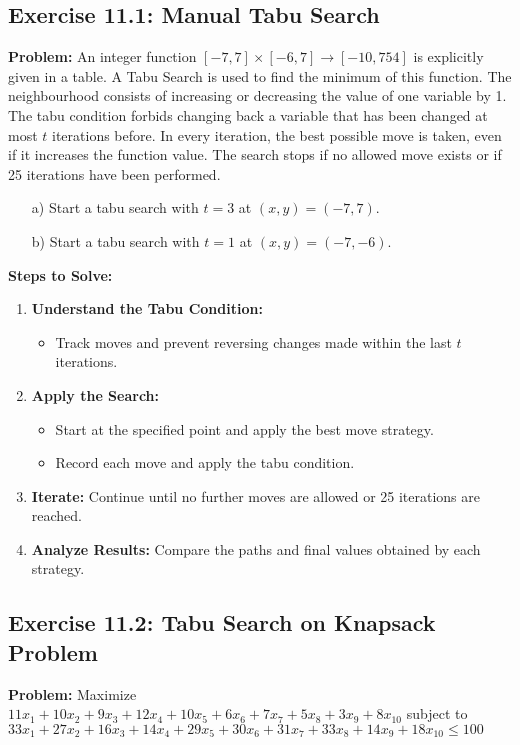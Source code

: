 \subsection{Exercise 11.1: Manual Tabu Search}
\textbf{Problem:}
An integer function \([-7, 7] \times [-6, 7] \to [-10, 754]\) is explicitly given in a table. A Tabu Search is used to find the minimum of this function. The neighbourhood consists of increasing or decreasing the value of one variable by 1. The tabu condition forbids changing back a variable that has been changed at most \(t\) iterations before. In every iteration, the best possible move is taken, even if it increases the function value. The search stops if no allowed move exists or if 25 iterations have been performed.

\begin{enumerate}
\item[a)] Start a tabu search with \(t=3\) at \((x, y) = (-7, 7)\).
\item[b)] Start a tabu search with \(t=1\) at \((x, y) = (-7, -6)\).
\end{enumerate}

\textbf{Steps to Solve:}
\begin{enumerate}
\item \textbf{Understand the Tabu Condition:}
  \begin{itemize}
  \item Track moves and prevent reversing changes made within the last \(t\) iterations.
  \end{itemize}
\item \textbf{Apply the Search:}
  \begin{itemize}
  \item Start at the specified point and apply the best move strategy.
  \item Record each move and apply the tabu condition.
  \end{itemize}
\item \textbf{Iterate:} Continue until no further moves are allowed or 25 iterations are reached.
\item \textbf{Analyze Results:} Compare the paths and final values obtained by each strategy.
\end{enumerate}

\subsection{Exercise 11.2: Tabu Search on Knapsack Problem}
\textbf{Problem:}
Maximize \(11x_1 + 10x_2 + 9x_3 + 12x_4 + 10x_5 + 6x_6 + 7x_7 + 5x_8 + 3x_9 + 8x_{10}\)
subject to \(33x_1 + 27x_2 + 16x_3 + 14x_4 + 29x_5 + 30x_6 + 31x_7 + 33x_8 + 14x_9 + 18x_{10} \leq 100\)

